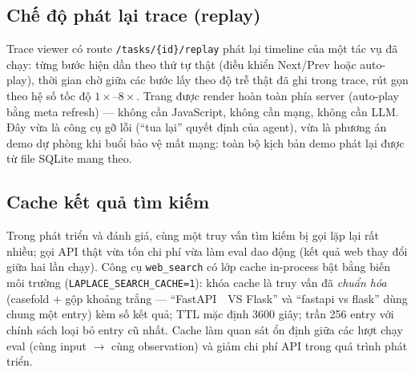 \subsection{Chế độ phát lại trace (replay)}
\label{sec:ky-thuat-replay}

Trace viewer có route \texttt{/tasks/\{id\}/replay} phát lại timeline của một
tác vụ đã chạy: từng bước hiện dần theo thứ tự thật (điều khiển Next/Prev
hoặc auto-play), thời gian chờ giữa các bước lấy theo độ trễ thật đã ghi
trong trace, rút gọn theo hệ số tốc độ $1\times$--$8\times$. Trang được
render hoàn toàn phía server (auto-play bằng meta refresh) --- không cần
JavaScript, không cần mạng, không cần LLM. Đây vừa là công cụ gỡ lỗi
(``tua lại'' quyết định của agent), vừa là phương án demo dự phòng khi buổi
bảo vệ mất mạng: toàn bộ kịch bản demo phát lại được từ file SQLite mang
theo.

\subsection{Cache kết quả tìm kiếm}
\label{sec:ky-thuat-cache}

Trong phát triển và đánh giá, cùng một truy vấn tìm kiếm bị gọi lặp lại rất
nhiều; gọi API thật vừa tốn chi phí vừa làm eval dao động (kết quả web thay
đổi giữa hai lần chạy). Công cụ \texttt{web\_search} có lớp cache in-process
bật bằng biến môi trường (\texttt{LAPLACE\_SEARCH\_CACHE=1}): khóa cache là
truy vấn đã \emph{chuẩn hóa} (casefold + gộp khoảng trắng --- ``FastAPI~~VS
Flask'' và ``fastapi vs flask'' dùng chung một entry) kèm số kết quả; TTL mặc
định 3600 giây; trần 256 entry với chính sách loại bỏ entry cũ nhất. Cache
làm quan sát ổn định giữa các lượt chạy eval (cùng input $\to$ cùng
observation) và giảm chi phí API trong quá trình phát triển.
